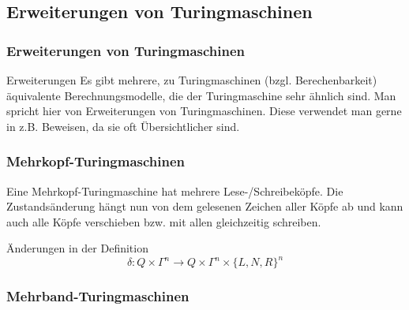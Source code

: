 \documentclass{beamer}
\begin{document}
{\subsection{Erweiterungen von Turingmaschinen}
\begin{frame}
\frametitle{Erweiterungen von Turingmaschinen}
\begin{block}{Erweiterungen}
Es gibt mehrere, zu Turingmaschinen (bzgl. Berechenbarkeit) äquivalente Berechnungsmodelle, die der Turingmaschine sehr ähnlich sind. Man spricht hier von Erweiterungen von Turingmaschinen. Diese verwendet man gerne in z.B. Beweisen, da sie oft Übersichtlicher sind.
\end{block}
\end{frame}
\begin{frame}
\frametitle{Mehrkopf-Turingmaschinen}
\vspace{-2cm}
\begin{figure}[H]
\begin{center}
\end{center}
\end{figure}
Eine Mehrkopf-Turingmaschine hat mehrere Lese-/Schreibeköpfe. Die Zustandsänderung hängt nun von dem gelesenen Zeichen aller Köpfe ab und kann auch alle Köpfe verschieben bzw. mit allen gleichzeitig schreiben.
\begin{block}{Änderungen in der Definition}
$$ \delta: Q \times \Gamma^n \rightarrow Q \times \Gamma^n \times \{L,N,R\}^n$$
\end{block}
\end{frame}

\begin{frame}
\frametitle{Mehrband-Turingmaschinen}
\vspace{-2cm}
\begin{figure}[H]
\begin{center}
\end{center}
\end{figure}
\end{frame}}
\end{document}
